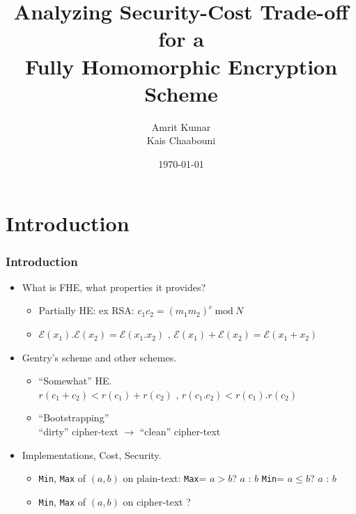 \documentclass{beamer}
\title[Fully Homomorphic Encryption Scheme]{Analyzing Security-Cost Trade-off for a\\Fully Homomorphic Encryption Scheme}
\author{Amrit Kumar \\ Kais Chaabouni \\}
\date{\today}
\institute{Ensimag}
\begin{document}
\begin{frame}
  \titlepage
\end{frame}

\section{Introduction}

\begin{frame}\frametitle{Introduction}
  \begin{itemize}
  \item What is FHE, what properties it provides?\\
    
    \begin{itemize}
      \pause
    \item Partially HE: ex RSA: $c_1c_2=(m_1m_2)^e \ \textrm {mod}\ N$
      \pause
    \item $\mathcal{E}(x_1).\mathcal{E}(x_2)=\mathcal{E}(x_1.x_2)$ , $\mathcal{E}(x_1)+\mathcal{E}(x_2)=\mathcal{E}(x_1+x_2)$   
      
    \end{itemize}
    \pause
  \item Gentry's scheme and other schemes.  
    
    \begin{itemize}
      \pause
    \item ``Somewhat'' HE. \\ 
      \pause
      $r(c_1+c_2) < r(c_1)+r(c_2)$ , $r(c_1.c_2) < r(c_1).r(c_2)$
      \pause
    \item ``Bootstrapping'' \\ 
      \pause
      ``dirty'' cipher-text $\rightarrow$ ``clean'' cipher-text
      
    \end{itemize}
    \pause
  \item Implementations, Cost, Security. \\
    
    \begin{itemize}
      \pause
    \item \texttt{Min}, \texttt{Max} of $(a,b)$ on plain-text:
       \newline \phantom{x}\hspace{3ex}  \texttt{Max}= $a > b$? $a$ : $b$ 
       \newline \phantom{x}\hspace{3ex}   \texttt{Min}= $a \leq b$? $a$ : $b$ 
      \pause
     \item \texttt{Min}, \texttt{Max} of $(a,b)$ on cipher-text ?

    \end{itemize}
  \end{itemize}
\end{frame}
\end{document}
